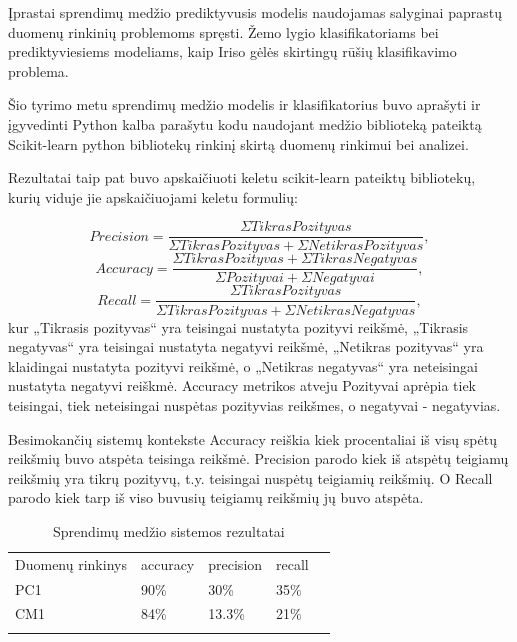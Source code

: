 \documentclass{VUMIFPSbakalaurinis}
\begin{document}
Įprastai sprendimų medžio prediktyvusis modelis naudojamas salyginai paprastų duomenų rinkinių problemoms spręsti. Žemo lygio klasifikatoriams bei prediktyviesiems modeliams, kaip Iriso gėlės skirtingų rūšių klasifikavimo problema.

Šio tyrimo metu sprendimų medžio modelis ir klasifikatorius buvo aprašyti ir įgyvedinti Python kalba parašytu kodu naudojant medžio biblioteką pateiktą Scikit-learn \cite{scikit-learn} python bibliotekų rinkinį skirtą duomenų rinkimui bei analizei.

Rezultatai taip pat buvo apskaičiuoti keletu scikit-learn pateiktų bibliotekų, kurių viduje jie apskaičiuojami keletu formulių:

\[Precision = \frac{\Sigma Tikras Pozityvas}{\Sigma Tikras Pozityvas + \Sigma Netikras Pozityvas},\]
\[Accuracy = \frac{\Sigma Tikras Pozityvas + \Sigma Tikras Negatyvas}{\Sigma Pozityvai+ \Sigma Negatyvai},\]
\[Recall = \frac{\Sigma Tikras Pozityvas}{\Sigma Tikras Pozityvas + \Sigma Netikras Negatyvas},\]
kur „Tikrasis pozityvas“ yra teisingai nustatyta pozityvi reikšmė, „Tikrasis negatyvas“ yra teisingai nustatyta negatyvi reikšmė, „Netikras pozityvas“ yra klaidingai nustatyta pozityvi reikšmė, o „Netikras negatyvas“ yra neteisingai nustatyta negatyvi reiškmė. Accuracy metrikos atveju Pozityvai aprėpia tiek teisingai, tiek neteisingai nuspėtas pozityvias reikšmes, o negatyvai - negatyvias.

Besimokančių sistemų kontekste Accuracy reiškia kiek procentaliai iš visų spėtų reikšmių buvo atspėta teisinga reikšmė. Precision parodo kiek iš atspėtų teigiamų reikšmių yra tikrų pozityvų, t.y. teisingai nuspėtų teigiamių reikšmių. O Recall parodo kiek tarp iš viso buvusių teigiamų reikšmių jų buvo atspėta.

\begin{table}[H]\footnotesize
\centering
\caption{Sprendimų medžio sistemos rezultatai}
\label{tab:Tree_result}
\begin{tabular}{lllll}
\cline{1-4}
\multicolumn{1}{|l}{Duomenų rinkinys} & accuracy & precision & \multicolumn{1}{l|}{recall} &  \\ \cline{1-4}
\multicolumn{1}{|l}{PC1}              & 90\%   & 30\%     & \multicolumn{1}{l|}{35\%} &  \\
\multicolumn{1}{|l}{CM1}              & 84\%    & 13.3\%     & \multicolumn{1}{l|}{21\%}  &  \\ \cline{1-4}
                                      &          &           &                             & 
\end{tabular}
\end{table}
\end{document}
